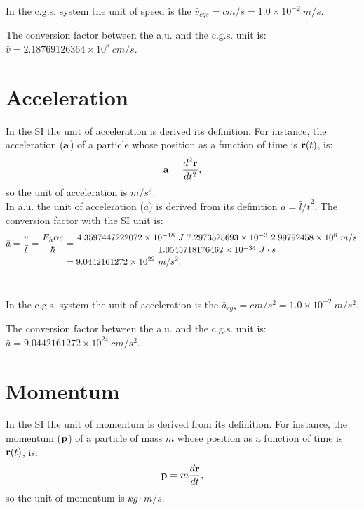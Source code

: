 \documentclass[12pt,a4paper]{article}
\def\hbarf{1.0545718176462\times 10^{-34}}
\def\cspeed{2.99792458\times 10^{8}}
\def\alphaf{7.2973525693\times 10^{-3}}
\def\bara{9.0442161272\times 10^{22}}
\def\baru{4.3597447222072\times 10^{-18}}
\def\cmtom{1.0\times 10^{-2}}
\def\barvcgs{2.18769126364\times 10^{8}}
\def\baracgs{9.0442161272\times 10^{24}}
\begin{document}
{\color{orange} In the c.g.s. system the unit of speed is the 
$\bar v_{cgs}=cm/s = \cmtom\ m/s$.
\\
}

{\color{green} The conversion factor between the a.u. and the c.g.s. unit is:
$\bar v=\barvcgs\ cm/s$.
\\
}

\newpage
\section{\color{coral}Acceleration}
In the SI the unit of acceleration is derived its  
definition. For instance, the acceleration (${\bf a}$) of a particle whose
position as a function of time is ${\bf r}(t)$, is: 
\begin{equation}
{\bf a}={d^2{\bf r} \over dt^2},
\end{equation} 
so the unit of acceleration is $m/s^2$.
\\

{\color{web-blue} In a.u. the unit of acceleration ($\bar a$) is derived 
from its definition $\bar a = \bar l / \bar t^2$. The conversion factor
with the SI unit is:
\begin{align}
\bar a = {\bar v \over \bar t}={E_h \alpha c \over \hbar}&= 
{\baru\ J\ \alphaf\ \cspeed\ m/s \over \hbarf\ J\cdot s}\nonumber \\
&= \bara\ m/s^2.
\end{align}
\\
}

{\color{orange} In the c.g.s. system the unit of acceleration is the $\bar a_{cgs}=cm/s^2 = \cmtom\ m/s^2$.
\\
}

{\color{green} The conversion factor between the a.u. and the c.g.s. unit is:
$\bar a=\baracgs\ cm/s^2$.
\\
}

\newpage
\section{\color{coral}Momentum}
In the SI the unit of momentum is derived from its definition.
For instance, the momentum (${\bf p}$) of a particle of mass $m$ whose
position as a function of time is ${\bf r}(t)$, is:
\begin{equation}
{\bf p}=m {d{\bf r} \over dt},
\end{equation} 
so the unit of momentum is $kg\cdot m/s$.
\\
\end{document}
